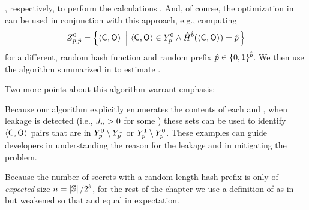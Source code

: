 \possibleDoubles{\secretsSet{}\cup\secretsSetAlt{}}, respectively, to
perform the calculations .  And,
of course, the optimization in 
can be used in conjunction with this approach, e.g., computing
\begin{align}
Z_{{p},{\hat{p}}}^{0}
= \left\{\langle\mathsf{C}_{}, \mathsf{O}_{}\rangle ~\left|~
  \langle\mathsf{C}_{}, \mathsf{O}_{}\rangle \in Y_{p}^{0} \wedge
    \hat{H}^{\hat{b}}(\langle\mathsf{C}_{},\mathsf{O}_{}\rangle) = \hat{p}
    \right.\right\}
\label{eqn:toCount}
\end{align}
for a different, random hash function
\hashPrefixFnAlt{\hashFnOutputPrefixBitsAlt} and random prefix
$\hat{p} \in \{0,1\}^{\hat{b}}$.  We
then use the algorithm summarized in
 to estimate
.

Two more points about this algorithm warrant emphasis:
\begin{compactitem}
\item Because our algorithm explicitly enumerates the contents of each
  and
  ,
  when leakage is detected (i.e., $J_{n} > 0$ for
  some \secretsSetSize) these sets can be used to identify
  $\langle\mathsf{C}_{}, \mathsf{O}_{}\rangle$ pairs that are in
  $Y_{p}^{0} \setminus
  Y_{p}^{1}$ or
  $Y_{p}^{1} \setminus
  Y_{p}^{0}$.  These examples
  can guide developers in understanding the reason for the leakage and
  in mitigating the problem.
\item Because the number of secrets with a random
  length-\hashFnOutputPrefixBits hash prefix \hashFnOutputPrefix is
  only of \textit{expected} size $n =
  \left|{\mathbb{S}}\right|/2^{b}$, for the rest
of the chapter we use a
  definition of \Jaccard{\secretsSetSize} as in 
  but weakened so that \setSize{\secretsSet{}} and
  \setSize{\secretsSetAlt{}} equal \secretsSetSize in expectation.
\end{compactitem}

